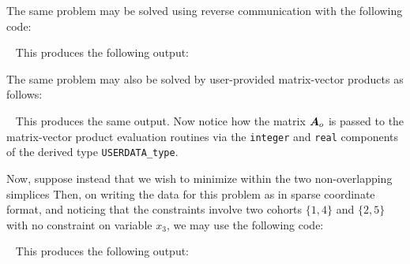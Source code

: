 \documentclass{galahad}
\begin{document}
The same problem may be solved using reverse communication with the
following code:

{\tt \small
\VerbatimInput{\packageexampleb}
}
\noindent
This produces the following output: \vspace*{-2mm}
{\tt \small
\VerbatimInput{\packageresultsb}
}
\noindent

The same problem may also be solved by user-provided matrix-vector
products as follows:

{\tt \small
\VerbatimInput{\packageexamplec}
}
\noindent
This produces the same output.
Now notice how the matrix ${\bm{A}}_o$ is passed to the matrix-vector product
evaluation routines via the {\tt integer} and
{\tt real} components of the derived type {\tt USERDATA\_type}.


Now, suppose instead that we wish to minimize
within the two non-overlapping simplices 
Then, on writing the data for this problem as
in sparse coordinate format, and noticing that the constraints
involve two cohorts $\{1,4\}$ and $\{2,5\}$ with no constraint on
variable $x_3$, we may use the following code:

{\tt \small
\VerbatimInput{\packageexampled}
}
\noindent
This produces the following output: \vspace*{-2mm}
{\tt \small
\VerbatimInput{\packageresultsd}
}
\noindent
\end{document}
